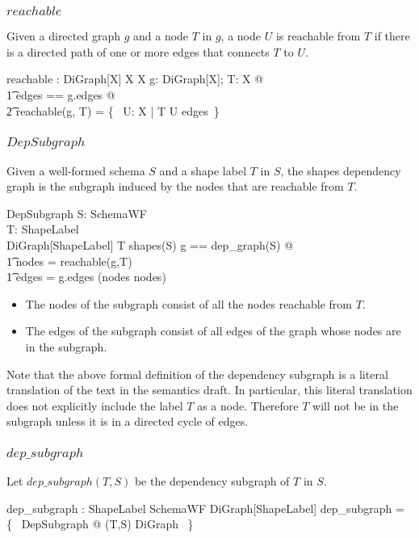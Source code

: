 \documentclass{article}
\begin{document}
\subsubsection{$reachable$}
Given a directed graph $g$ and a node $T$ in $g$, a node $U$ is reachable from $T$ if there is a directed path of one or more edges that connects
$T$ to $U$.
\begin{gendef}[X]
	reachable : DiGraph[X] \cross X \fun \power X
\where
	\forall g: DiGraph[X]; T: X @ \\
\t1		\LET edges == g.edges @ \\
\t2			reachable(g, T) = \{~ U: X | T \mapsto U \in edges\plus ~\}
\end{gendef}

\subsubsection{$DepSubgraph$}
Given a well-formed schema $S$ and a shape label $T$ in $S$, the shapes dependency
graph is the subgraph induced by the nodes that are reachable from $T$.
\begin{schema}{DepSubgraph}
	S: SchemaWF \\
	T: ShapeLabel \\
	DiGraph[ShapeLabel]
\where
	T \in shapes(S)
\also
	\LET g == dep\_graph(S) @ \\
\t1		nodes = reachable(g,T) \land \\
\t1		edges = g.edges \cap (nodes \cross nodes)
\end{schema}
\begin{itemize}
\item The nodes of the subgraph consist of all the nodes reachable from $T$.
\item The edges of the subgraph consist of all edges of the graph whose nodes are in the subgraph.
\end{itemize}

Note that the above formal definition of the dependency subgraph is a literal translation of the text in the semantics draft.
In particular, this literal translation does not explicitly include the label $T$ as a node.
Therefore $T$ will not be in the subgraph unless it is in a directed cycle of edges.

\subsubsection{$dep\_subgraph$}
Let $dep\_subgraph(T,S)$ be the dependency subgraph of $T$ in $S$.
\begin{axdef}
	dep\_subgraph : ShapeLabel \cross SchemaWF \pfun DiGraph[ShapeLabel]
\where
	dep\_subgraph = \{~ DepSubgraph @ (T,S) \mapsto \theta DiGraph ~\}
\end{axdef}
\end{document}
